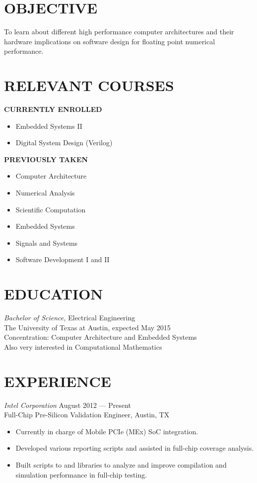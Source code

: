 \documentclass[margin]{res}
\begin{document}
\begin{resume}
  \section{OBJECTIVE} 
  To learn about different high performance computer architectures and
  their hardware implications on software design for floating point
  numerical performance.
  \section{RELEVANT COURSES}
{\footnotesize\textbf{CURRENTLY ENROLLED}}
\vspace{-.75em}
\begin{multicols}{2}
  \begin{itemize}
  \item Embedded Systems II
  \item Digital System Design (Verilog)
  \end{itemize}
\end{multicols}
\vspace{-1.5em}
{\footnotesize\textbf{PREVIOUSLY TAKEN}}
\vspace{-.75em}
  \begin{multicols}{2}
    \begin{itemize}
    \item Computer Architecture
    \item Numerical Analysis
    \item Scientific Computation
    \item Embedded Systems
    \item Signals and Systems
    \item Software Development I and II
    \end{itemize}
  \end{multicols}
  \section{EDUCATION} 
  {\sl Bachelor of Science,} Electrical Engineering \\
  The University of Texas at Austin,
  expected May 2015 \\
  Concentration: Computer Architecture and Embedded Systems\\
  Also very interested in Computational Mathematics

  \section{EXPERIENCE} {\sl Intel Corporation} 
  \hfill August 2012 --- Present \\
  Full-Chip Pre-Silicon Validation Engineer, Austin, TX
  \begin{itemize}
  \item Currently in charge of Mobile PCIe (MEx) SoC integration.
  \item Developed various reporting scripts and assisted in full-chip
    coverage analysis.
  \item Built scripts to and libraries to analyze and improve
    compilation and simulation performance in full-chip testing.
  \end{itemize}


\end{resume}
\end{document}
